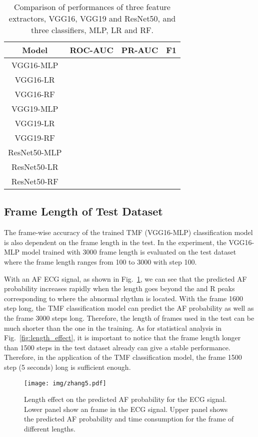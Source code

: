 \documentclass[journal]{IEEEtran}
\begin{document}
\begin{table}[H]
  \caption{Comparison of performances of three feature extractors, VGG16, VGG19 and ResNet50, and three classifiers, MLP, LR and RF.}
  \centering
  \begin{tabular}{cccc}
  \hline
  Model     &   ROC-AUC   &   PR-AUC  &  F1  \\ 
  \hline
  VGG16-MLP &     &     & \\
  VGG16-LR &      &     & \\
  VGG16-RF &      &     & \\
  \hline
  VGG19-MLP&      &     & \\
  VGG19-LR &      &     & \\
  VGG19-RF &      &     & \\
  \hline
  ResNet50-MLP &     &     & \\
  ResNet50-LR &      &     & \\
  ResNet50-RF &      &     & \\
  \hline
  \end{tabular}
  \label{tab:result-net-classifier}
\end{table}

\subsection{Frame Length of Test Dataset}

The frame-wise accuracy of the trained TMF (VGG16-MLP) classification model is also dependent on the frame length in the test. In the experiment, the VGG16-MLP model trained with 3000 frame length is evaluated on the test dataset where the frame length ranges from 100 to 3000 with step 100. 

With an AF ECG signal, as shown in Fig.~\ref{fig:flexibility}, we can see that the predicted AF probability  increases rapidly when the length goes beyond the  and  R peaks corresponding to where the abnormal rhythm is located. With the frame 1600 step long,  the TMF classification model can predict the AF probability  as well as the frame 3000 steps long. Therefore, the length of frames used in the test can be much shorter than the one in the training. As for statistical analysis in Fig.~\ref{fig:length_effect}, it is important to notice that the frame length longer than 1500 steps in the test dataset already can give a stable performance. Therefore, in the application of the TMF classification model, the frame 1500 step (5 seconds) long is sufficient enough. 
\begin{figure}[ht]
  \centering
  \texttt{[image: img/zhang5.pdf]}
  \caption{Length effect on the predicted AF probability for the ECG signal. Lower panel show an frame in the ECG signal. Upper panel shows the predicted AF probability  and time consumption for the frame of different lengths.}
  \label{fig:flexibility}
\end{figure}
\end{document}
